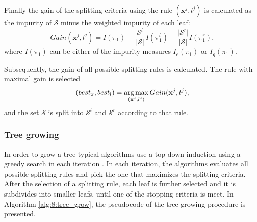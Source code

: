 Finally the gain of the splitting criteria using the rule $(\mathbf{x}^j,l^j)$ is calculated as the 
impurity of $\mathcal{S}$ minus the weighted impurity of each leaf:
\begin{equation}\label{eq:8:gain}
  Gain(\mathbf{x}^j,l^j)=I(\pi_1)-\frac{\vert \mathcal{S}^l \vert}{\vert \mathcal{S} 
\vert}I(\pi^l_1)  -\frac{\vert \mathcal{S}^r \vert}{\vert \mathcal{S} \vert}I(\pi^r_1),
\end{equation} 
where $I(\pi_1)$ can be either of the impurity measures $I_e(\pi_1)$ or $I_g(\pi_1)$.

Subsequently, the gain of all possible splitting rules is calculated. The rule with maximal 
gain is selected
\begin{equation}
  (best_x, best_l) = \operatorname*{arg\,max}_{(\mathbf{x}^j,l^j)}Gain(\mathbf{x}^j,l^j),
\end{equation}
and the set $\mathcal{S}$ is split into $\mathcal{S}^l$ and $\mathcal{S}^r$ according to that rule. 


\subsubsection{Tree growing}
In order to grow a tree typical algorithms use a top-down induction using a greedy search in each
iteration \citep{Rokach2010}. In each iteration, the algorithms evaluates all possible splitting 
rules and pick the one that maximizes the splitting criteria. After the selection of a splitting 
rule, each leaf is further selected and it is subdivides into smaller leafs, until one of the 
stopping criteria is meet. In Algorithm \ref{alg:8:tree_grow}, the pseudocode of the tree 
growing procedure is presented.


